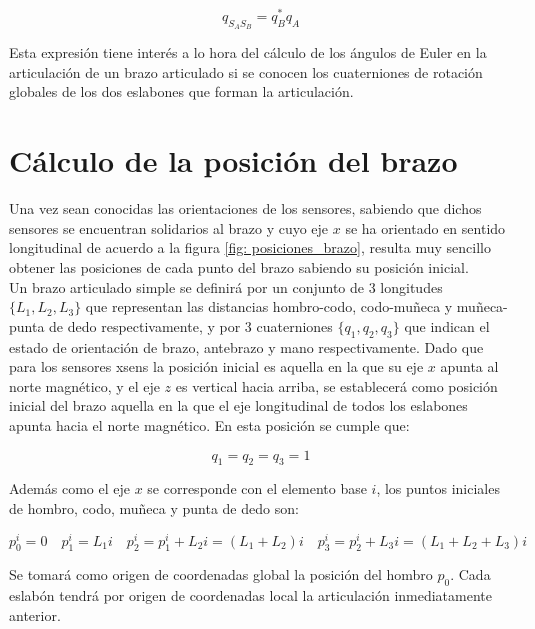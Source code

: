 \documentclass[12pt, a4paper]{report}
\begin{document}
\begin{equation} \label{eq: E18}
q_{S_AS_B} = q_B^*q_A
\end{equation}

Esta expresión tiene interés a lo hora del cálculo de los ángulos de Euler en la articulación de un brazo articulado si se conocen los cuaterniones de rotación globales de los dos eslabones que forman la articulación.

\section{Cálculo de la posición del brazo}

Una vez sean conocidas las orientaciones de los sensores, sabiendo que dichos sensores se encuentran solidarios al brazo y cuyo eje $x$ se ha orientado en sentido longitudinal de acuerdo a la figura \ref{fig: posiciones_brazo}, resulta muy sencillo obtener las posiciones de cada punto del brazo sabiendo su posición inicial. \\

Un brazo articulado simple se definirá por un conjunto de 3 longitudes $\{L_1, L_2, L_3\}$ que representan las distancias hombro-codo, codo-muñeca y muñeca-punta de dedo respectivamente, y por 3 cuaterniones $\{q_1, q_2, q_3\}$ que indican el estado de orientación de brazo, antebrazo y mano respectivamente. Dado que para los sensores xsens la posición inicial es aquella en la que su eje $x$ apunta al norte magnético, y el eje $z$ es vertical hacia arriba, se establecerá como posición inicial del brazo aquella en la que el eje longitudinal de todos los eslabones apunta hacia el norte magnético. En esta posición se cumple que:

$$ q_1 = q_2 = q_3 = 1 $$

Además como el eje $x$ se corresponde con el elemento base $i$, los puntos iniciales de hombro, codo, muñeca y punta de dedo son:

$$ p_0^i = 0 \quad p_1^i = L_1i \quad p_2^i = p_1^i + L_2i = (L_1 + L_2)i \quad p_3^i = p_2^i + L_3i = (L_1 + L_2 + L_3)i $$

Se tomará como origen de coordenadas global la posición del hombro $p_0$. Cada eslabón tendrá por origen de coordenadas local la articulación inmediatamente anterior.
\end{document}
